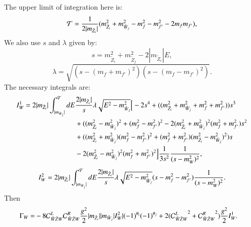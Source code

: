 \documentclass[final,3p,times,pdflatex]{elsarticle}
\begin{document}
The upper limit of integration here is:
\begin{equation}
\mathcal{T} = {1 \over 2|m_{\tilde{Z}_{i}}|} (m_{\tilde{Z}_i}^2 + m_{\tilde{W}_j}^2 - m_{f}^2 - m_{f'}^2 - 2m_{f}m_{f'}),
\end{equation}
We also use $s$ and $\lambda$ given by:
\begin{equation}
s = m_{\tilde{Z}_{i}}^2 + m_{\tilde{Z}_j}^2 - 2|m_{\tilde{Z}_i}|E,
\end{equation}
\begin{equation}
\lambda = \sqrt{(s - (m_{f} + m_{f'})^2)(s - (m_{f} - m_{f'})^2)}.
\end{equation}
The necessary integrals are:	
\begin{equation}
\begin{aligned}
I_{W}^{1} = 2|m_{\tilde{Z}_i}| \int_{|m_{\tilde{W}_{j}}|}^{\mathcal{T}} dE & {2|m_{\tilde{Z}_i}| \over s} \lambda \sqrt{E^2 - m_{\tilde{W}_j}^2} \Big[-2s^4 + ((m_{\tilde{Z}_i}^2 + m_{\tilde{W}_j}^2 + m_{f}^2 + m_{f'}^2))s^3 \\ & + ((m_{\tilde{Z}_i}^2 - m_{\tilde{W}_j}^2)^2 + (m_{f}^2 - m_{f'}^2)^2 - 2(m_{\tilde{Z}_i}^2 + m_{\tilde{W}_j}^2)^2 (m_{f}^2 + m_{f'}^2)s^2 \\ & + ((m_{\tilde{Z}_i}^2 + m_{\tilde{W}_j}^2)(m_{f}^2 - m_{f'}^2)^2 + (m_{f}^2 + m_{f'}^2)(m_{\tilde{Z}_i}^2 - m_{\tilde{W}_j}^2)^2)s \\ & - 2(m_{\tilde{Z_{i}}}^2 - m_{\tilde{W}_j}^2)^2 (m_{f}^2 + m_{f'}^2)^2\Big]{1 \over 3s^2}{1 \over (s-m_{W}^2)^2},
\end{aligned}
\end{equation}
\begin{equation}
\begin{aligned}
I_{W}^{2} = 2|m_{\tilde{Z}_i}| \int_{|m_{\tilde{W}_{j}}|}^{\mathcal{T}} dE {2|m_{\tilde{Z}_i}| \over s} \lambda \sqrt{E^2 - m_{\tilde{W}_j}^2} (s - m_{f}^2 - m_{f'}^2){1 \over (s-m_{W}^2)^2}.
\end{aligned}
\end{equation}
Then
\begin{equation}
\begin{aligned}
\Gamma_W = & -8 \mathcal{C}_{\tilde{W} \tilde{Z} W}^L  \mathcal{C}_{\tilde{W} \tilde{Z} W}^R  {g^2 \over 2} |m_{\tilde{Z}_i}||m_{\tilde{W}_j}|I_{W}^2|(-1)^{\theta_i}(-1)^{\theta_j} + 2({\mathcal{C}_{\tilde{W} \tilde{Z} W}^L}^2 + {\mathcal{C}_{\tilde{W} \tilde{Z} W}^R}^2){g^2 \over 2} I_{W}^1.
\end{aligned}
\end{equation}
\end{document}
